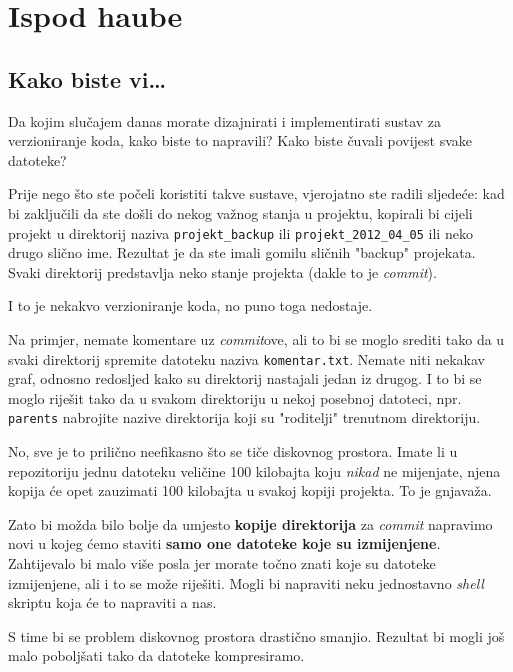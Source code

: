 \chapter*{Ispod haube}

\section*{Kako biste vi\dots}

Da kojim slučajem danas morate dizajnirati i implementirati sustav za verzioniranje koda, kako biste to napravili?
Kako biste čuvali povijest svake datoteke?

Prije nego što ste počeli koristiti takve sustave, vjerojatno ste radili sljedeće: kad bi zaključili da ste došli do nekog važnog stanja u projektu, kopirali bi cijeli projekt u direktorij naziva \verb+projekt_backup+ ili \verb+projekt_2012_04_05+ ili neko drugo slično ime.
Rezultat je da ste imali gomilu sličnih "backup" projekata.
Svaki direktorij predstavlja neko stanje projekta (dakle to je \emph{commit}).

I to je nekakvo verzioniranje koda, no puno toga nedostaje.

Na primjer, nemate komentare uz \emph{commit}ove, ali to bi se moglo srediti tako da u svaki direktorij spremite datoteku naziva \verb+komentar.txt+.
Nemate niti nekakav graf, odnosno redosljed kako su direktorij nastajali jedan iz drugog.
I to bi se moglo riješit tako da u svakom direktoriju u nekoj posebnoj datoteci, npr. \verb+parents+ nabrojite nazive direktorija koji su "roditelji" trenutnom direktoriju.

No, sve je to prilično neefikasno što se tiče diskovnog prostora. 
Imate li u repozitoriju jednu datoteku veličine 100 kilobajta koju \emph{nikad} ne mijenjate, njena kopija će opet zauzimati 100 kilobajta u svakoj kopiji projekta.
To je gnjavaža.

Zato bi možda bilo bolje da umjesto \textbf{kopije direktorija} za \emph{commit} napravimo novi u kojeg ćemo staviti \textbf{samo one datoteke koje su izmijenjene}.
Zahtijevalo bi malo više posla jer morate točno znati koje su datoteke izmijenjene, ali i to se može riješiti.
Mogli bi napraviti neku jednostavno \emph{shell} skriptu koja će to napraviti a nas. 

S time bi se problem diskovnog prostora drastično smanjio. 
Rezultat bi mogli još malo poboljšati tako da datoteke kompresiramo.

